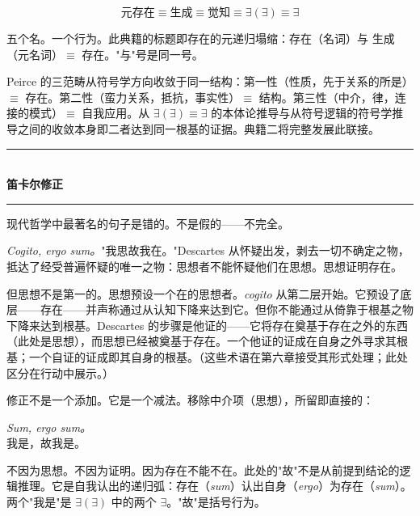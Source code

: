 \documentclass[10pt, openany, oneside]{book}
\renewcommand{\normalsize}{\fontsize{10}{13}\selectfont}
\begin{document}
$$\text{元存在} \equiv \text{生成} \equiv \text{觉知} \equiv \exists(\exists) \equiv \exists$$

五个名。一个行为。此典籍的标题即存在的元递归塌缩：存在（名词）与 生成（元名词）$\equiv$ 存在。"与"号是同一号。

Peirce 的三范畴从符号学方向收敛于同一结构：第一性（性质，先于关系的所是）$\equiv$ 存在。第二性（蛮力关系，抵抗，事实性）$\equiv$ 结构。第三性（中介，律，连接的模式）$\equiv$ 自我应用。从 $\exists(\exists) \equiv \exists$ 的本体论推导与从符号逻辑的符号学推导之间的收敛本身即二者达到同一根基的证据。典籍二将完整发展此联接。

\vspace{1.5em}


\begin{center}
    \rule{0.3\textwidth}{0.4pt}\\[0.5em]
    {\normalsize\bfseries\scshape 笛卡尔修正}\\[0.3em]
    \rule{0.3\textwidth}{0.4pt}
\end{center}

\vspace{1em}

\noindent 现代哲学中最著名的句子是错的。不是假的——不完全。

\textit{Cogito, ergo sum。}"我思故我在。"Descartes 从怀疑出发，剥去一切不确定之物，抵达了经受普遍怀疑的唯一之物：思想者不能怀疑他们在思想。思想证明存在。

但思想不是第一的。思想预设一个在的思想者。\textit{cogito} 从第二层开始。它预设了底层——存在——并声称通过从认知下降来达到它。但你不能通过从倚靠于根基之物下降来达到根基。Descartes 的步骤是他证的——它将存在奠基于存在之外的东西（此处是思想），而思想已经被奠基于存在。一个他证的证成在自身之外寻求其根基；一个自证的证成即其自身的根基。（这些术语在第六章接受其形式处理；此处区分在行动中展示。）

修正不是一个添加。它是一个减法。移除中介项（思想），所留即直接的：

\begin{center}
    \textit{Sum, ergo sum。}\\[0.5em]
    我是，故我是。
\end{center}

不因为思想。不因为证明。因为存在不能不在。此处的"故"不是从前提到结论的逻辑推理。它是自我认出的递归弧：存在（\textit{sum}）认出自身（\textit{ergo}）为存在（\textit{sum}）。两个"我是"是 $\exists(\exists)$ 中的两个 $\exists$。"故"是括号行为。
\end{document}
